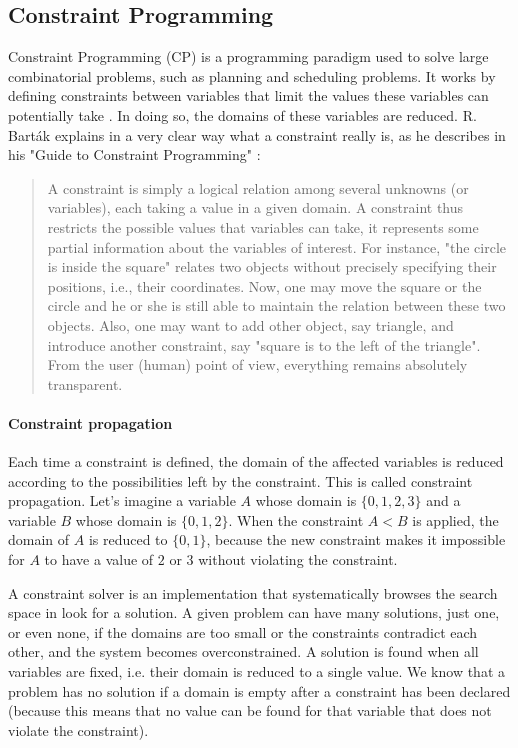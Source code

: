 \subsection{Constraint Programming}
Constraint Programming (CP) is a programming paradigm used to solve large combinatorial problems, such as planning and scheduling problems. It works by defining constraints between variables that limit the values these variables can potentially take \cite{rossi2008constraint}. In doing so, the domains of these variables are reduced. R. Barták explains in a very clear way what a constraint really is, as he describes in his "Guide to Constraint Programming" \cite{bartak1998constraint}:

\begin{quote}
    A constraint is simply a logical relation among several unknowns (or variables), each taking a value in a given domain. A constraint thus restricts the possible values that variables can take, it represents some partial information about the variables of interest. For instance, "the circle is inside the square" relates two objects without precisely specifying their positions, i.e., their coordinates. Now, one may move the square or the circle and he or she is still able to maintain the relation between these two objects. Also, one may want to add other object, say triangle, and introduce another constraint, say "square is to the left of the triangle". From the user (human) point of view, everything remains absolutely transparent.
\end{quote}

\paragraph{Constraint propagation}
Each time a constraint is defined, the domain of the affected variables is reduced according to the possibilities left by the constraint. This is called constraint propagation. Let's imagine a variable $A$ whose domain is $\{0, 1, 2, 3\}$ and a variable $B$ whose domain is $\{0, 1, 2\}$. When the constraint $A<B$ is applied, the domain of $A$ is reduced to $\{0, 1\}$, because the new constraint makes it impossible for $A$ to have a value of $2$ or $3$ without violating the constraint.

A constraint solver is an implementation that systematically browses the search space in look for a solution. A given problem can have many solutions, just one, or even none, if the domains are too small or the constraints contradict each other, and the system becomes overconstrained.
A solution is found when all variables are fixed, i.e. their domain is reduced to a single value. We know that a problem has no solution if a domain is empty after a constraint has been declared (because this means that no value can be found for that variable that does not violate the constraint).

